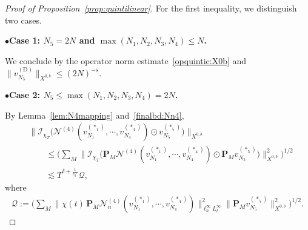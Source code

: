 \documentclass[10pt,a4paper]{amsart}
\newcommand{\dotcirc}{\mathbin{\odot}}
\newcommand{\noi}{\noindent}
\begin{document}
\begin{proof}[Proof of Proposition~\ref{prop:quintilinear}]
For the first inequality, we distinguish two cases.

\noi
$\bullet${\bf Case 1: $N_5=2N$ and $\max(N_1,N_2,N_3,N_4)\leq N$.}

We conclude by the operator norm estimate~\eqref{opquintic:X0b} and $\|v_{N_5}^{(\mathrm{D})}\|_{X^{0,b}}\leq (2N)^{-s}$.

\medskip

\noi
$\bullet${\bf Case 2: $N_5 \leq \max(N_1,N_2,N_3,N_4)=2N$.}

By Lemma~\ref{lem:N4mapping} and~\eqref{finalbd:Nn4},
\begin{align*}
	&\big\|
	\mathcal{I}_{\chi_T}\big(\mathcal{N}^{(4)}(v_{N_1}^{(\ast_1)},\cdots, v_{N_4}^{(\ast_4)})\dotcirc v_{N_5}^{(\ast_5)}\big)
	\big\|_{X^{0,b}}\\ &\qquad\leq
	\Big(\sum_{M}
	\big\|\mathcal{I}_{\chi_T}\big(\mathbf{P}_{M}\mathcal{N}^{(4)}(v_{N_1}^{(\ast_1)},\cdots, v_{N_4}^{(\ast_4)})\dotcirc \mathbf{P}_{M}v_{N_5}^{(\ast_5)}\big)
	\big\|_{X^{0,b}}^2
	\Big)^{1/2}\\
	&\qquad\lesssim T^{\delta+\frac{1}{r_0'}}\mathcal{Q},
\end{align*}
where
\begin{align}\label{eq:Q}
	\mathcal{Q}:=\Big(
	\sum_{M}\|\chi(t)\,\mathbf{P}_M\mathcal{N}_n^{(4)}(v_{N_1}^{(\ast_1)},\cdots, v_{N_4}^{(\ast_4)})\|_{\ell_n^{\infty}L_t^{\infty}}^2 \|\mathbf{P}_M v_{N_5}^{(\ast_5)}\|_{X^{0,b}}^2
	\Big)^{1/2}.
\end{align}



\end{proof}
\end{document}
